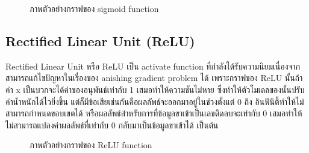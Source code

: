 \documentclass[12pt,oneside,openright,a4paper]{cpe-thai-project}
\begin{document}
\begin{figure}[!ht]\centering
  \setlength{\fboxrule}{0.2mm} %
  \setlength{\fboxsep}{1cm}
  \caption{ภาพตัวอย่างกราฟของ sigmoid function}\label{fig:sigmoid}
\end{figure}

\subsection{Rectified Linear Unit (ReLU)\cite{ReLuFunc}}
Rectified Linear Unit หรือ ReLU เป็น activate function ที่กำลังได้รับความนิยมเนื่องจากสามารถแก้ไขปัญหาในเรื่องของ 
anishing gradient problem ได้ เพราะกราฟของ ReLU นั้นถ้าค่า x เป็นบวกจะได้ค่าของอนุพันธ์เท่ากับ 1 เสมอทำให้ความชันไม่หาย 
ซึ่งทำให้ตัวโมเดลของนั้นปรับค่าน้ำหนักได้ไวยิ่งขึ้น แต่ก็มีข้อเสียเช่นกันคือผลลัพธ์จะออกมาอยู่ในช่วงตั้งแต่ 0 ถึง อินฟินิตี้ทำให้ไม่สามารถกำหนดขอบเขตได้ หรือผลลัพธ์สำหรับการที่ข้อมูลขาเข้าเป็นเลขติดลบจะเท่ากับ 
0 เสมอทำให้ไม่สามารถแปลงค่าผลลัพธ์ที่เท่ากับ 0 กลับมาเป็นข้อมูลขาเข้าได้ เป็นต้น 


\begin{figure}[!ht]\centering
  \setlength{\fboxrule}{0.2mm} %
  \setlength{\fboxsep}{1cm}
  \caption{ภาพตัวอย่างกราฟของ ReLU function}\label{fig:relu}
\end{figure}
\end{document}
